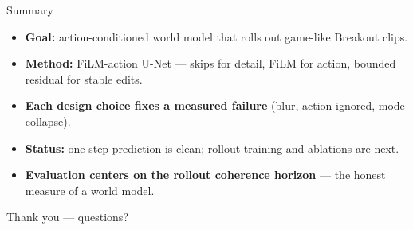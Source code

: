 \documentclass[aspectratio=169]{beamer}
\begin{document}
\begin{frame}{Summary}
  \begin{itemize}
    \item \textbf{Goal:} action-conditioned world model that rolls out
          game-like Breakout clips.
    \item \textbf{Method:} FiLM-action U-Net --- skips for detail, FiLM for action,
          bounded residual for stable edits.
    \item \textbf{Each design choice fixes a measured failure} (blur,
          action-ignored, mode collapse).
    \item \textbf{Status:} one-step prediction is clean; rollout training and
          ablations are next.
    \item \textbf{Evaluation centers on the rollout coherence horizon} --- the
          honest measure of a world model.
  \end{itemize}
  \vspace{0.6em}
  \centering
  \large Thank you --- questions?
\end{frame}
\end{document}
